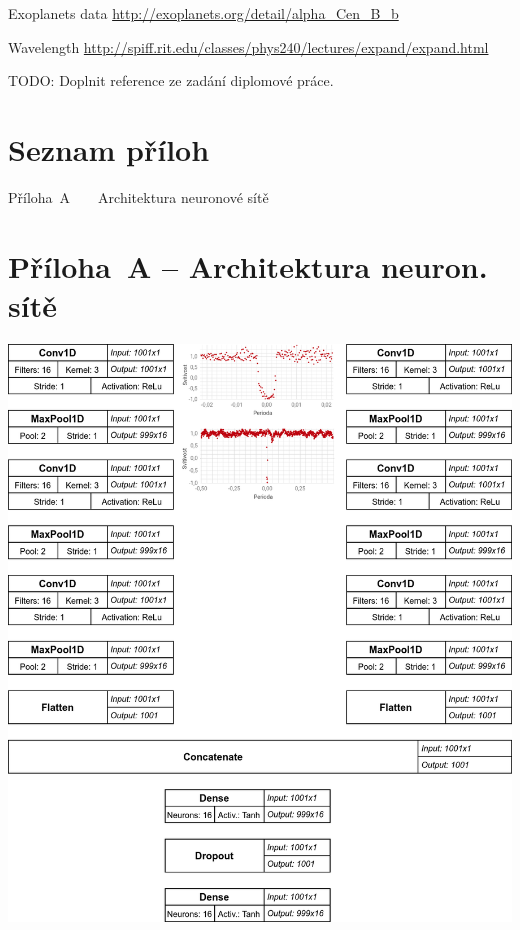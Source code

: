 \documentclass[a4paper,12pt]{article}
\begin{document}
{{{{{{{{{{{{\begin{thebibliography}{99}


\end{thebibliography}

Exoplanets data \url{http://exoplanets.org/detail/alpha_Cen_B_b}

Wavelength \url{http://spiff.rit.edu/classes/phys240/lectures/expand/expand.html}

TODO: Doplnit reference ze zadání diplomové práce.

\clearpage\pagestyle{plain}
\section*{Seznam příloh}

\noindent Příloha~A~~~~Architektura neuronové sítě \dotfill \pageref{priloha_a}

\section*{Příloha~A -- Architektura neuron. sítě}\label{priloha_a}
\includegraphics[width=\linewidth]{img/lc_cnn.png}

}}}}}}}}}}}}
\end{document}
